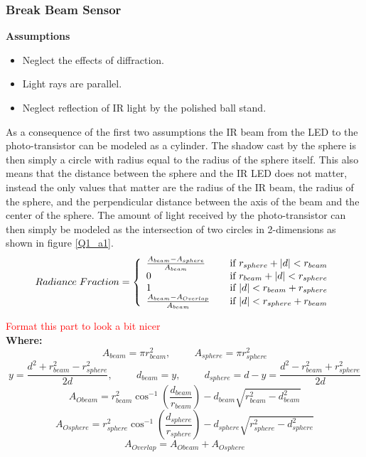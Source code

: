 \documentclass{article}
\newcommand{\xxx}[1]{\textcolor{red}{#1}}
\theoremstyle{plain}
\theoremstyle{definition}
\theoremstyle{remark}
\begin{document}
\subsubsection*{Break Beam Sensor}

\textbf{Assumptions} 
\begin{itemize}
\item Neglect the effects of diffraction.
\item Light rays are parallel. 
\item Neglect reflection of IR light by the polished ball stand.
\end{itemize}
As a consequence of the first two assumptions the IR beam from the LED to the photo-transistor can be modeled as a cylinder.  The shadow cast by the sphere is then simply a circle with radius equal to the radius of the sphere itself.  This also means that the distance between the sphere and the IR LED does not matter, instead the only values that matter are the radius of the IR beam, the radius of the sphere, and the perpendicular distance between the axis of the beam and the center of the sphere.  The amount of light received by the photo-transistor can then simply be modeled as the intersection of two circles in 2-dimensions as shown in figure \ref{Q1_a1}. \\

\[
  Radiance \hspace{0.1cm} Fraction = \left\{
  \begin{array}{l l}
    \frac{A_{beam} - A_{sphere}}{A_{beam}} & \quad \text{if } r_{sphere} + |d| < r_{beam} \\
    0 & \quad \text{if } r_{beam} + |d| < r_{sphere} \\
    1 & \quad \text{if } |d| < r_{beam} + r_{sphere} \\
    \frac{A_{beam} - A_{Overlap}}{A_{beam}} & \quad \text{if } |d| < r_{sphere} + r_{beam} \\
  \end{array} \right.
\]

\xxx{Format this part to look a bit nicer} \\
\textbf{Where:}
$$ A_{beam} = \pi r_{beam}^2, \hspace{1cm} A_{sphere} = \pi r_{sphere}^2 $$ 
$$ y = \frac{d^2+r_{beam}^2-r_{sphere}^2}{2d}, \hspace{1cm} d_{beam}=y, \hspace{1cm} d_{sphere}=d-y=\frac{d^2-r_{beam}^2+r_{sphere}^2}{2d} $$
$$ A_{Obeam} = r_{beam}^2 \cos^{-1} (\frac{d_{beam}}{r_{beam}})-d_{beam} \sqrt{r_{beam}^2-d_{beam}^2}$$ 
$$ A_{Osphere} = r_{sphere}^2 \cos^{-1} (\frac{d_{sphere}}{r_{sphere}})-d_{sphere} \sqrt{r_{sphere}^2-d_{sphere}^2}$$
$$ A_{Overlap} = A_{Obeam} + A_{Osphere} $$
\end{document}
